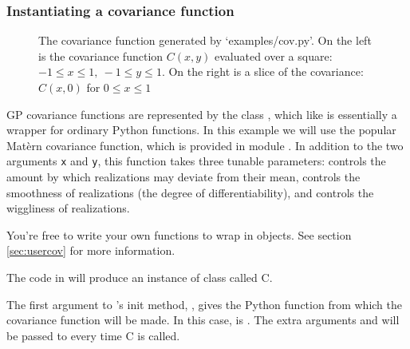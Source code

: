 \documentclass[]{manual}
\begin{document}
\subsubsection{Instantiating a covariance function}\label{subsub:cov}
\begin{figure}
    \centering
    \caption{The covariance function generated by {\sffamily `examples/cov.py'}. On the left is the covariance function $C(x,y)$ evaluated over a square: $-1\le x\le 1,\ -1\le y\le 1$. On the right is a slice of the covariance: $C(x,0)$ for $0\le x \le 1$}
    \label{fig:cov}
\end{figure}

GP covariance functions are represented by the class , which like  is essentially a wrapper for ordinary Python functions. In this example we will use the popular Mat\`ern covariance function, which is provided in module . In addition to the two arguments \texttt{x} and \texttt{y}, this function takes three tunable parameters:  controls the amount by which realizations may deviate from their mean,  controls the smoothness of realizations (the degree of differentiability), and  controls the wiggliness of realizations.

You're free to write your own functions to wrap in  objects. See section \ref{sec:usercov} for more information.

The code in  will produce an instance of class  called C.


The first argument to 's init method, , gives the Python function from which the covariance function will be made. In this case,  is . The extra arguments  and  will be passed to  every time C is called.
\end{document}
